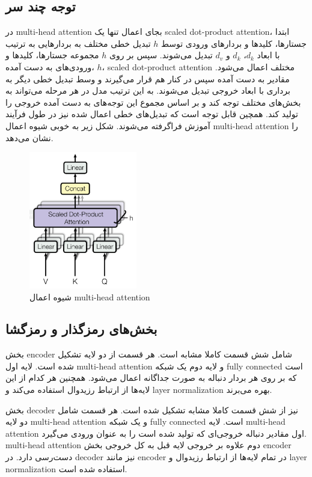 \subsection{توجه چند سر}
در \gls{multi-head attention} بجای اعمال تنها یک \gls{scaled dot-product
attention}، ابتدا جستارها، کلیدها و بردارهای ورودی توسط $h$ تبدیل خطی مختلف به
بردارهایی به ترتیب با ابعاد $d_k$، $d_k$ و $d_v$ تبدیل می‌شوند. سپس بر روی $h$
مجموعه جستارها، کلیدها و ورودی‌های به دست آمده، $h$، \gls{scaled dot-product
attention} مختلف اعمال می‌شود. مقادیر به دست آمده سپس در کنار هم قرار می‌گیرند و
وسط تبدیل خطی دیگر به برداری با ابعاد خروجی تبدیل می‌شوند. به این ترتیب مدل در
هر مرحله می‌تواند به بخش‌های مختلف توجه کند و بر اساس مجموع این توجه‌های به دست
آمده خروجی را تولید کند. همچین قابل توجه است که تبدیل‌های خطی اعمال شده نیز در
طول فرآیند آموزش فراگرفته می‌شوند. شکل زیر به خوبی شیوه اعمال \gls{multi-head
attention} را نشان می‌دهد.
\begin{figure}[ht]
    \centering
    \includegraphics[height=6cm]{./statics/multi_head_attention.png}
    \caption{شیوه اعمال \gls{multi-head attention}}
\end{figure}

\subsection{بخش‌های رمزگذار و رمزگشا}
بخش \gls{encoder} شامل شش قسمت کاملا مشابه است. هر قسمت از دو لایه تشکیل شده
است. لایه اول \gls{multi-head attention} و لایه دوم یک شبکه \gls{fully
connected} است که بر روی هر بردار دنباله به صورت جداگانه اعمال می‌شود. همچنین هر
کدام از این لایه‌ها از ارتباط رزیدوال استفاده می‌کند و \gls{layer normalization}
بهره می‌برند.

بخش \gls{decoder} نیز از شش قسمت کاملا مشابه تشکیل شده است. هر قسمت شامل دو لایه
\gls{multi-head attention} و یک شبکه \gls{fully connected} است. لایه
\gls{multi-head attention} اول مقادیر دنباله خروجی‌ای که تولید شده است را به
عنوان ورودی می‌گیرد. \gls{multi-head attention} دوم علاوه بر خروجی لایه قبل به
کل خروجی بخش \gls{encoder} دست‌رسی دارد. در \gls{decoder} نیز مانند
\gls{encoder} در تمام لایه‌ها از ارتباط رزیدوال و \gls{layer normalization}
استفاده شده است.

